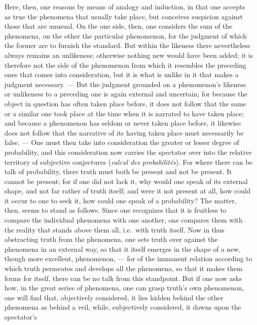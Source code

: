 \documentclass[12pt]{book}
\newcommand{\opage}[1]{\marginnote{\footnotesize\textit{[#1]}}}
\begin{document}
Here, then, one reasons by means of analogy and induction, in that one accepts
as true the phenomena that usually take place, but conceives suspicion against
those that are unusual. On the one side, then, one considers the sum of the
phenomena, on the other the particular phenomenon, for the judgment of which
the former are to furnish the standard. But within the
\opage{15} likeness there nevertheless always remains an unlikeness; otherwise
nothing new would have been added; it is therefore not the side of the
phenomenon from which it resembles the preceding ones that comes into
consideration, but it is what is unlike in it that makes a judgment necessary.
--- But the judgment grounded on a phenomenon's likeness or unlikeness to a
preceding one is again external and uncertain; for because the object in
question has often taken place before, it does not follow that the same or a
similar one took place at the time when it is narrated to have taken place; and
because a phenomenon has seldom or never taken place before, it likewise does
not follow that the narrative of its having taken place must necessarily be
false. --- One must then take into consideration the greater or lesser degree of
probability, and this consideration now carries the spectator over into the
relative territory of subjective conjectures
(\textit{calcul des probabilités}). For where there can be talk of probability,
there truth must both be present and not be present. It cannot be present; for
if one did not lack it, why would one speak of its external shape, and not far
rather of truth itself; and were it not present at all, how could it occur to
one to seek it, how could one speak of a probability? The matter, then, seems to
stand as follows. Since one recognizes that it is fruitless to compare the
individual phenomena with one another, one compares them with the reality that
stands above them all, i.e.\ with truth itself. Now in thus abstracting truth
from the phenomena, one sets truth over against the phenomena in an external
way, so that it itself emerges in the shape of a new, though more excellent,
phenomenon, ---
for of the immanent relation according to which truth permeates and develops
all the phenomena, so that it makes them forms for itself, there can
\opage{16} be no talk from this standpoint. But if one now asks how, in the great
series of phenomena, one can grasp truth's own phenomenon, one will find that,
objectively considered, it lies hidden behind the other phenomena as behind a
veil, while, subjectively considered, it dawns upon the spectator's
\end{document}
